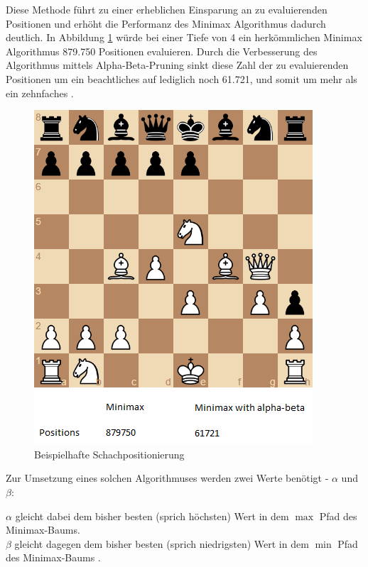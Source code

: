 Diese Methode führt zu einer erheblichen Einsparung an zu evaluierenden Positionen und erhöht die Performanz des Minimax Algorithmus dadurch deutlich. In Abbildung \ref{fig:chess_example} würde bei einer Tiefe von 4 ein herkömmlichen Minimax Algorithmus 879.750 Positionen evaluieren. Durch die Verbesserung des Algorithmus mittels Alpha-Beta-Pruning sinkt diese Zahl der zu evaluierenden Positionen um ein beachtliches auf lediglich noch 61.721, und somit um mehr als ein zehnfaches \cite{Hartikka}.

\begin{figure}[h]
\centering
\includegraphics[width=\textwidth/2]{images/alpha-beta-example.png}

\caption{Beispielhafte Schachpositionierung \cite{Hartikka}}\label{fig:chess_example}
\end{figure}

Zur Umsetzung eines solchen Algorithmuses werden zwei Werte benötigt - $\alpha$ und $\beta$:

$\alpha$ gleicht dabei dem bisher besten (sprich höchsten) Wert in dem $\max$ Pfad des Minimax-Baums.\\
$\beta$ gleicht dagegen dem bisher besten (sprich niedrigsten) Wert in dem $\min$ Pfad des Minimax-Baums \cite{Russell2010}.

